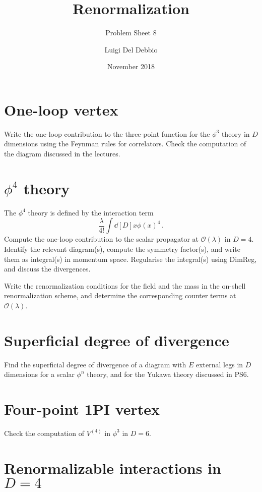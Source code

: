 \documentclass{tutorial}
\subtitle{Problem Sheet 8}
\title{Renormalization}
\author{Luigi Del Debbio}
\date{November 2018}
\begin{document}
\maketitle

\section{ One-loop vertex}

Write the one-loop contribution to the three-point function for the
$\phi^3$ theory in $D$ dimensions using the Feynman rules for
correlators. Check the computation of the diagram discussed in the
lectures.

\section{ $\phi^4$ theory}

The $\phi^4$ theory is defined by the interaction term
\[
  \frac{\lambda}{4!} \int \dd[D]{x}\phi(x)^4\, .
\]
Compute the one-loop contribution to the scalar propagator at
$\mathcal{O}(\lambda)$ in $D=4$. Identify the relevant diagram(s), compute the symmetry
factor(s), and write them as integral(s) in momentum space. Regularise
the integral(s) using DimReg, and discuss the divergences.

Write the renormalization conditions for the field and the mass in
the on-shell renormalization scheme, and determine the corresponding
counter terms at $\mathcal{O}(\lambda)$.

\section{ Superficial degree of divergence}

Find the superficial degree of divergence of a diagram with $E$
external legs in $D$ dimensions for a scalar $\phi^n$ theory, and for
the Yukawa theory discussed in PS6.

\section{ Four-point 1PI vertex}

Check the computation of $V^{(4)}$ in $\phi^3$ in $D=6$.

\section{ Renormalizable interactions in $D=4$}
\end{document}
